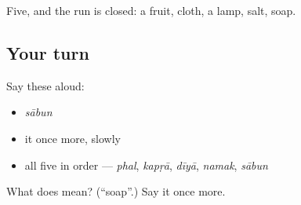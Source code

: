 \begin{grammarlens}[title={What you've built}]
Five, and the run is closed: a fruit, cloth, a lamp, salt, soap.
\end{grammarlens}

\subsection*{Your turn}
Say these aloud:

\begin{itemize}
\raggedright
  \item \emph{sābun}
  \item it once more, slowly
  \item all five in order — \emph{phal}, \emph{kapṛā}, \emph{dīyā}, \emph{namak}, \emph{sābun}
\end{itemize}

\begin{tcolorbox}[breakable,colback=teal!4,colframe=teal!35!black,title={Before you move on}]
What does  mean? (\textquotedblleft{}soap\textquotedblright{}.) Say it once more.
\end{tcolorbox}

